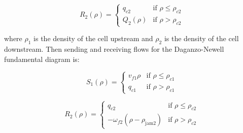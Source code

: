 \begin{equation} \label{eq:receivingFlow1}
R_{2}(\rho) = \begin{cases}
q_{c2} & \text{if } \rho \leq \rho_{c2} \\
Q_{2}(\rho) &  \text{if } \rho > \rho_{c2}
\end{cases}
\end{equation}

\noindent where $\rho_{1}$ is the density of the cell upstream and $\rho_{2}$ is the density of the cell downstream. Then sending and receiving flows for the Daganzo-Newell fundamental diagram is:

\begin{equation} \label{eq:sendingFlow2}
S_{1}(\rho) = \begin{cases}
v_{f1}\rho & \text{if } \rho \leq \rho_{c1} \\
q_{c1} &  \text{if } \rho > \rho_{c1}
\end{cases}
\end{equation}

\begin{equation} \label{eq:receivingFlow2}
R_{2}(\rho) = \begin{cases}
q_{c2} & \text{if } \rho \leq \rho_{c2} \\
-\omega_{f2} \left( \rho - \rho_{\text{jam}2} \right) & \text{if } \rho > \rho_{c2}
\end{cases}
\end{equation}

